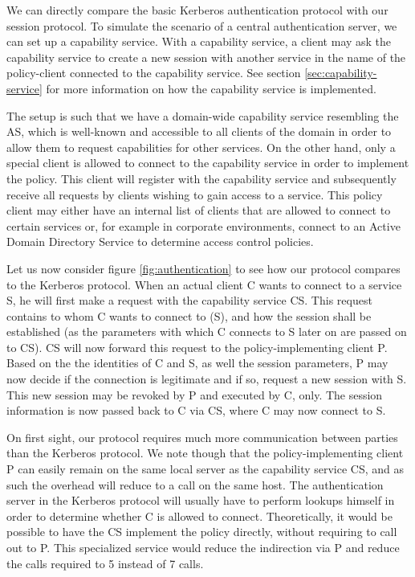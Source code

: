 We can directly compare the basic Kerberos authentication protocol with our session protocol.
To simulate the scenario of a central authentication server, we can set up a capability service.
With a capability service, a client may ask the capability service to create a new session with another service in the name of the policy-client connected to the capability service.
See section \ref{sec:capability-service} for more information on how the capability service is implemented.

The setup is such that we have a domain-wide capability service resembling the AS, which is well-known and accessible to all clients of the domain in order to allow them to request capabilities for other services.
On the other hand, only a special client is allowed to connect to the capability service in order to implement the policy.
This client will register with the capability service and subsequently receive all requests by clients wishing to gain access to a service.
This policy client may either have an internal list of clients that are allowed to connect to certain services or, for example in corporate environments, connect to an Active Domain Directory Service to determine access control policies.

Let us now consider figure \ref{fig:authentication} to see how our protocol compares to the Kerberos protocol.
When an actual client C wants to connect to a service S, he will first make a request with the capability service CS.
This request contains to whom C wants to connect to (S), and how the session shall be established (as the parameters with which C connects to S later on are passed on to CS).
CS will now forward this request to the policy-implementing client P.
Based on the the identities of C and S, as well the session parameters, P may now decide if the connection is legitimate and if so, request a new session with S.
This new session may be revoked by P and executed by C, only.
The session information is now passed back to C via CS, where C may now connect to S.

On first sight, our protocol requires much more communication between parties than the Kerberos protocol.
We note though that the policy-implementing client P can easily remain on the same local server as the capability service CS, and as such the overhead will reduce to a call on the same host.
The authentication server in the Kerberos protocol will usually have to perform lookups himself in order to determine whether C is allowed to connect.
Theoretically, it would be possible to have the CS implement the policy directly, without requiring to call out to P.
This specialized service would reduce the indirection via P and reduce the calls required to 5 instead of 7 calls.

